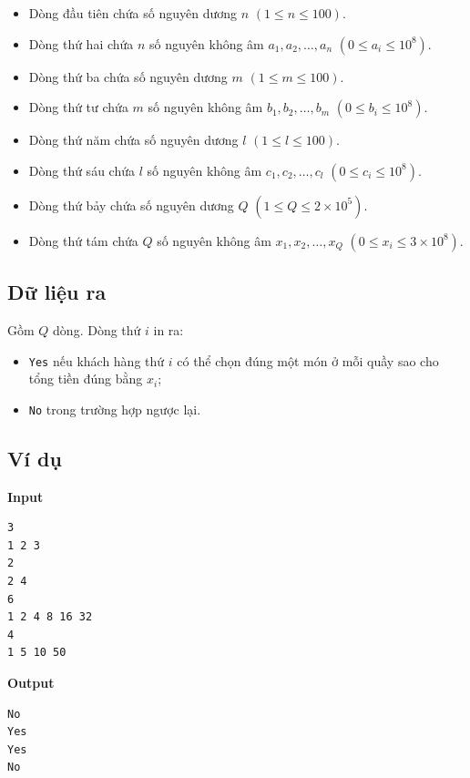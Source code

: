 \begin{itemize}
    \item Dòng đầu tiên chứa số nguyên dương $n$ $(1 \le n \le 100)$.
    \item Dòng thứ hai chứa $n$ số nguyên không âm $a_1, a_2, \dots, a_n$ $(0 \le a_i \le 10^8)$.
    \item Dòng thứ ba chứa số nguyên dương $m$ $(1 \le m \le 100)$.
    \item Dòng thứ tư chứa $m$ số nguyên không âm $b_1, b_2, \dots, b_m$ $(0 \le b_i \le 10^8)$.
    \item Dòng thứ năm chứa số nguyên dương $l$ $(1 \le l \le 100)$.
    \item Dòng thứ sáu chứa $l$ số nguyên không âm $c_1, c_2, \dots, c_l$ $(0 \le c_i \le 10^8)$.
    \item Dòng thứ bảy chứa số nguyên dương $Q$ $(1 \le Q \le 2 \times 10^5)$.
    \item Dòng thứ tám chứa $Q$ số nguyên không âm $x_1, x_2, \dots, x_Q$ $(0 \le x_i \le 3 \times 10^8)$.
\end{itemize}

\subsection*{Dữ liệu ra}

Gồm $Q$ dòng.  
Dòng thứ $i$ in ra:

\begin{itemize}
    \item \texttt{Yes} nếu khách hàng thứ $i$ có thể chọn đúng một món ở mỗi quầy sao cho tổng tiền đúng bằng $x_i$;
    \item \texttt{No} trong trường hợp ngược lại.
\end{itemize}

\subsection*{Ví dụ}

\noindent
\begin{minipage}[t]{0.48\textwidth}
\textbf{Input}
\begin{verbatim}
3
1 2 3
2
2 4
6
1 2 4 8 16 32
4
1 5 10 50
\end{verbatim}
\end{minipage}
\hfill
\begin{minipage}[t]{0.48\textwidth}
\textbf{Output}
\begin{verbatim}
No
Yes
Yes
No
\end{verbatim}
\end{minipage}


